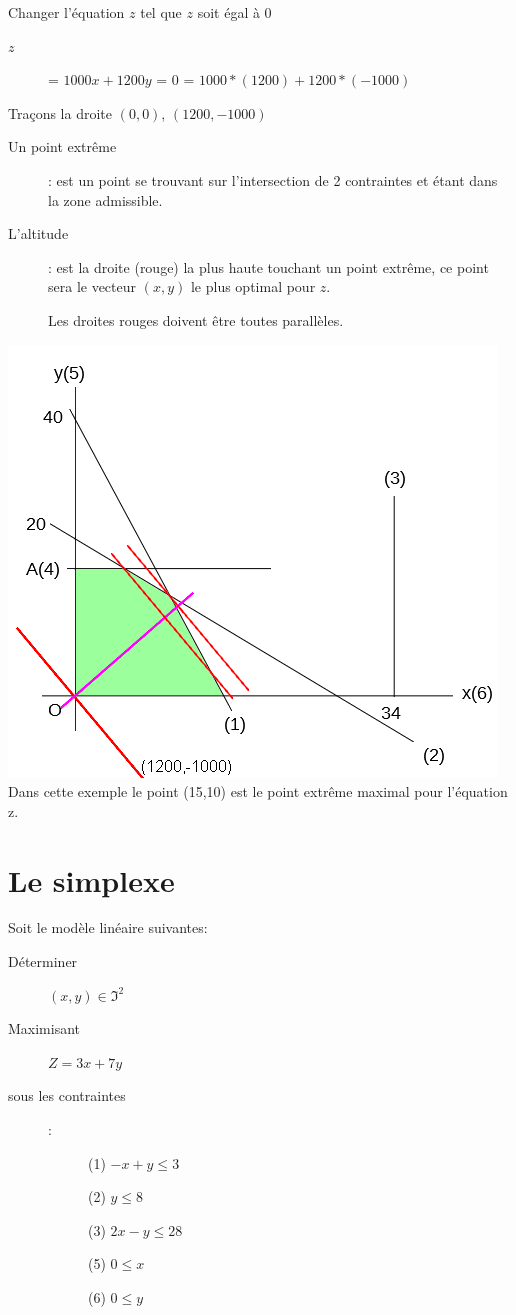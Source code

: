 Changer l'équation $z$ tel que $z$ soit égal à $0$
\begin{description}
\item[$z$] = $1000x + 1200y$ = $0$ = $1000*(1200) + 1200 *(-1000)$
\end{description}
Traçons la droite $(0,0)$, $(1200,-1000)$
\begin{description}
\item[Un point extrême]: est un point se trouvant sur l'intersection de 2 contraintes et étant dans la zone admissible.
\item[L'altitude]: est la droite (rouge) la plus haute touchant un point extrême, ce point sera le vecteur $(x,y)$ le plus optimal pour $z$.
\item[] Les droites rouges doivent être toutes parallèles.
\end{description}
\includegraphics[scale=0.55]{img/ro-pl-2var_1.png} \\
Dans cette exemple le point (15,10) est le point extrême maximal pour l'équation z.\\
\pagebreak
\chapter{Le simplexe}\pagebreak
Soit le modèle linéaire suivantes:
\begin{description}
\item[Déterminer] $(x,y) \in \Im^2$
\item[Maximisant] $Z = 3x + 7y$
\item[sous les contraintes]:
\begin{description}
\item[] (1) $ -x + y \leq 3$
\item[] (2) $ y \leq 8$
\item[] (3) $ 2x - y \leq 28$
\item[] (5) $ 0 \leq x$
\item[] (6) $ 0 \leq y$
\end{description}
\end{description}

